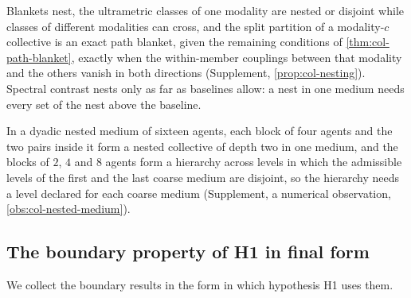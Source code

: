 Blankets nest, the ultrametric classes of one modality are nested or disjoint while classes of different modalities can cross, and the split partition of a modality-$c$ collective is an exact path blanket, given the remaining conditions of \cref{thm:col-path-blanket}, exactly when the within-member couplings between that modality and the others vanish in both directions (Supplement, \cref{prop:col-nesting}). Spectral contrast nests only as far as baselines allow: a nest in one medium needs every set of the nest above the baseline.

In a dyadic nested medium of sixteen agents, each block of four agents and the two pairs inside it form a nested collective of depth two in one medium, and the blocks of $2$, $4$ and $8$ agents form a hierarchy across levels in which the admissible levels of the first and the last coarse medium are disjoint, so the hierarchy needs a level declared for each coarse medium (Supplement, a numerical observation, \cref{obs:col-nested-medium}).

\subsection{The boundary property of H1 in final form}\label{sec:col-boundary}

We collect the boundary results in the form in which hypothesis H1 uses them.


